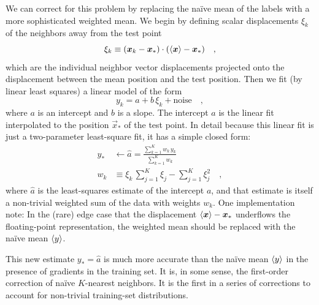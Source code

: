 \documentclass[modern]{aastex63}
\begin{document}
We can correct for this problem by replacing the na\"ive mean of the labels
with a more sophisticated weighted mean.
We begin by defining scalar displacements $\xi_k$ of the neighbors away
from the test point
\begin{equation}
  \xi_k \equiv (\vec{x}_k - \vec{x}_\ast)\cdot(\mean{\vec{x}} - \vec{x}_\ast)
  \quad ,
\end{equation}
which are the individual neighbor vector displacements
projected onto the displacement between
the mean position and the test position.
Then we fit (by linear least squares) a linear model of the form
\begin{equation}
  y_k = a + b\,\xi_k + \mbox{noise}
  \quad ,
\end{equation}
where $a$ is an intercept and $b$ is a slope.
The intercept $a$ is the linear
fit interpolated to the position $\vec{x}_\ast$ of the test point.
In detail because this linear fit is just a two-parameter least-square fit,
it has a simple closed form:
\begin{align}
  y_\ast & \leftarrow \hat{a} = \frac{\sum_{k=1}^K w_k\,y_k}{\sum_{k=1}^K w_k}
  \\
  w_k & \equiv \xi_k\,\sum_{j=1}^K \xi_j - \sum_{j=1}^K \xi_j^2
  \quad ,
\end{align}
where $\hat{a}$ is the least-squares estimate of the intercept $a$, and that
estimate is itself a non-trivial weighted sum of the data with weights $w_k$.
One implementation note:
In the (rare) edge case that the displacement
$\left\langle \boldsymbol{x} \right\rangle-\boldsymbol{x}_\ast$ underflows the
floating-point representation, the weighted mean should be replaced with the
na\"ive mean $\left\langle y \right\rangle$.

This new estimate $y_\ast=\hat{a}$ is much more accurate than the na\"ive mean $\left\langle y \right\rangle$
in the presence of gradients in the training set.
It is, in some sense, the first-order correction of na\"ive $K$-nearest
neighbors. It is the first in a series of corrections to account for non-trivial
training-set distributions.



\end{document}
